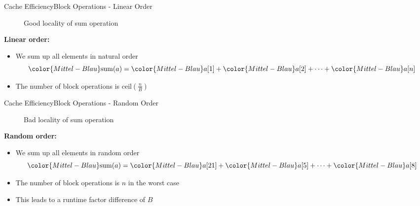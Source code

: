 \begin{frame}{Cache Efficiency}{Block Operations - Linear Order}
  \vspace{-1.0em}
  \begin{figure}%
    \begin{adjustbox}{width=\linewidth}%
    \end{adjustbox}%
    \caption{Good locality of sum operation}
    \label{fig:caching:memory_locality_linear}
  \end{figure}%
  \vspace{-1.0em}
  \textbf{Linear order:}
  \begin{itemize}
    \item
      We sum up all elements in {\color{Mittel-Blau}natural order}
      \begin{displaymath}
        {\color{Mittel-Blau}\mathrm{sum}(a)} =
        {\color{Mittel-Blau}a[1]} +
        {\color{Mittel-Blau}a[2]} +
        \dots +
        {\color{Mittel-Blau}a[n]}
      \end{displaymath}
    \item
      The number of block operations is
      {\color{Mittel-Blau}$\mathrm{ceil}\left(\frac{n}{B}\right)$}
  \end{itemize}
\end{frame}


\begin{frame}{Cache Efficiency}{Block Operations - Random Order}
  \vspace{-1.0em}
  \begin{figure}%
    \begin{adjustbox}{width=\linewidth}%
    \end{adjustbox}%
    \caption{Bad locality of sum operation}
    \label{fig:caching:memory_locality_random}
  \end{figure}%
  \vspace{-1.0em}
  \textbf{Random order:}
  \begin{itemize}
    \item
      We sum up all elements in {\color{Mittel-Blau}random order}
      \begin{displaymath}
        {\color{Mittel-Blau}\mathrm{sum}(a)} =
        {\color{Mittel-Blau}a[21]} +
        {\color{Mittel-Blau}a[5]} +
        \dots +
        {\color{Mittel-Blau}a[8]}
      \end{displaymath}
    \item
      The number of block operations is {\color{Mittel-Blau}$n$} in the
      {\color{Mittel-Blau}worst case}
    \item
      This leads to a runtime factor difference of {\color{Mittel-Blau}$B$}
  \end{itemize}
\end{frame}

